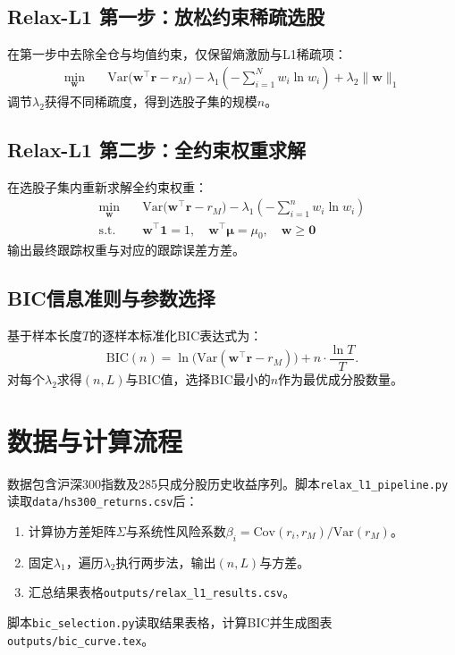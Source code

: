 \documentclass[UTF8]{ctexart}
\begin{document}
\subsection{Relax-L1 第一步：放松约束稀疏选股}
在第一步中去除全仓与均值约束，仅保留熵激励与L1稀疏项：
\begin{align*}
\min_{\boldsymbol{w}} \quad & \mathrm{Var}\big(\boldsymbol{w}^\top \boldsymbol{r} - r_M\big) - \lambda_1 \left(-\sum_{i=1}^N w_i\ln w_i\right) + \lambda_2 \|\boldsymbol{w}\|_1
\end{align*}
调节$\lambda_2$获得不同稀疏度，得到选股子集的规模$n$。

\subsection{Relax-L1 第二步：全约束权重求解}
在选股子集内重新求解全约束权重：
\begin{align*}
\min_{\boldsymbol{w}} \quad & \mathrm{Var}\big(\boldsymbol{w}^\top \boldsymbol{r} - r_M\big) - \lambda_1 \left(-\sum_{i=1}^n w_i\ln w_i\right) \\
\text{s.t.} \quad & \boldsymbol{w}^\top \boldsymbol{1} = 1,\quad \boldsymbol{w}^\top \boldsymbol{\mu} = \mu_0,\quad \boldsymbol{w}\ge \boldsymbol{0}
\end{align*}
输出最终跟踪权重与对应的跟踪误差方差。

\subsection{BIC信息准则与参数选择}
基于样本长度$T$的逐样本标准化BIC表达式为：
\[
\mathrm{BIC}(n) = \ln\big(\mathrm{Var}(\boldsymbol{w}^\top \boldsymbol{r} - r_M)\big) + n\cdot \frac{\ln T}{T}.
\]
对每个$\lambda_2$求得$(n,L)$与BIC值，选择BIC最小的$n$作为最优成分股数量。

\section{数据与计算流程}
数据包含沪深300指数及285只成分股历史收益序列。脚本\texttt{relax\_l1\_pipeline.py}读取\texttt{data/hs300\_returns.csv}后：
\begin{enumerate}
  \item 计算协方差矩阵$\Sigma$与系统性风险系数$\beta_i=\mathrm{Cov}(r_i,r_M)/\mathrm{Var}(r_M)$。
  \item 固定$\lambda_1$，遍历$\lambda_2$执行两步法，输出$(n,L)$与方差。
  \item 汇总结果表格\texttt{outputs/relax\_l1\_results.csv}。
\end{enumerate}
脚本\texttt{bic\_selection.py}读取结果表格，计算BIC并生成图表\texttt{outputs/bic\_curve.tex}。
\end{document}
